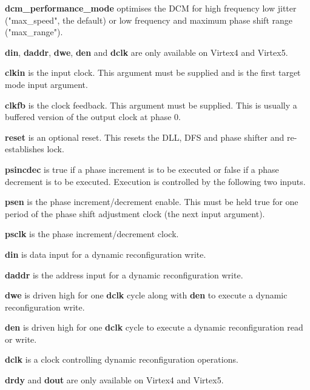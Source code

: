                 {\bf dcm\_performance\_mode} optimises the DCM for high frequency low jitter
                ("max\_speed", the default) or low frequency and maximum phase shift range
                ("max\_range").

            
                {\bf din}, {\bf daddr}, {\bf dwe},  {\bf den} and {\bf dclk}
                are only available on Virtex4 and Virtex5.

                {\bf clkin} is the input clock. This argument must be
                supplied and is the first target mode input argument.

                {\bf clkfb} is the clock feedback. This argument must be
                supplied. This is usually a buffered version of the output clock at
                phase 0.

                {\bf reset} is an optional reset. This resets the
                DLL, DFS and phase shifter and re-establishes lock.

                {\bf psincdec} is true if a phase increment is to be
                executed or false if a phase decrement is to be executed. Execution is
                controlled by the following two inputs.

                {\bf psen} is the phase increment/decrement enable.
                This must be held true for one period of the phase shift adjustment
                clock (the next input argument). 

                {\bf psclk} is the phase increment/decrement clock.

                {\bf din} is data input for a dynamic reconfiguration write.

                {\bf daddr} is the address input for a dynamic reconfiguration
                write.

                {\bf dwe} is driven high for one {\bf dclk} cycle along with
                {\bf den} to execute a dynamic reconfiguration write.

                {\bf den} is driven high for one {\bf dclk} cycle to execute
                a dynamic reconfiguration read or write.

                {\bf dclk} is a clock controlling dynamic reconfiguration
                operations.


                {\bf drdy} and {\bf dout} are only available on Virtex4 and
                Virtex5.
                
